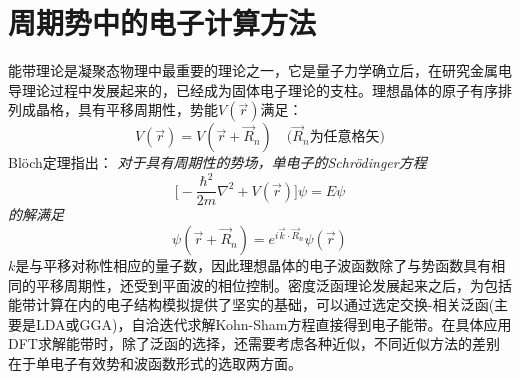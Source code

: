 \chapter{周期势中的电子计算方法}
能带理论是凝聚态物理中最重要的理论之一，它是量子力学确立后，在研究金属电导理论过程中发展起来的，已经成为固体电子理论的支柱。理想晶体的原子有序排列成晶格，具有平移周期性，势能$V(\vec r)$满足：
\begin{equation}\label{eq:solid-2}
	V(\vec r)=V(\vec r+\vec R_n)\quad\mbox{($\vec R_n$为任意格矢)}
\end{equation}
\textrm{Bl\"och}定理指出：
{\it 对于具有周期性的势场，单电子的Schr\"odinger方程}
\begin{equation}\label{eq:solid-1}
  \biggl[-\dfrac{\hbar^2}{2m}\nabla^2+V(\vec r)\biggr]\psi=E\psi
\end{equation}
{\it 的解满足}
\begin{equation}
  \psi(\vec r+\vec R_n)=e^{i\vec k\cdot\vec R_n}\psi(\vec r)
  \label{eq:bloch}
\end{equation}
$k$是与平移对称性相应的量子数，因此理想晶体的电子波函数除了与势函数具有相同的平移周期性，还受到平面波的相位控制。密度泛函理论发展起来之后，为包括能带计算在内的电子结构模拟提供了坚实的基础，可以通过选定交换-相关泛函(主要是LDA或GGA)，自洽迭代求解Kohn-Sham方程直接得到电子能带。在具体应用DFT求解能带时，除了泛函的选择，还需要考虑各种近似，不同近似方法的差别在于单电子有效势和波函数形式的选取两方面。

